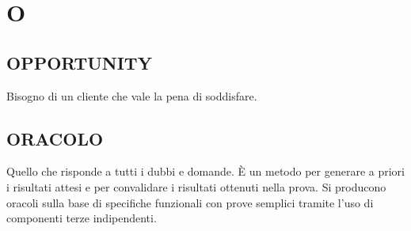 \newpage
	\flushright{\hyperref[index]{\color{black!65}{Ritorna all'indice}}}\flushleft
	\section{O} \label{sec:O}
	
		\subsection{OPPORTUNITY}  \label{opportunity}
		Bisogno di un cliente che vale la pena di soddisfare.
	
		\subsection{ORACOLO}		\label{oracolo}	%
		Quello che risponde a tutti i dubbi e domande. È un metodo per generare a priori i risultati attesi e per convalidare i risultati ottenuti nella prova. Si producono oracoli sulla base di specifiche funzionali con prove semplici tramite l'uso di componenti terze indipendenti.
		
	

